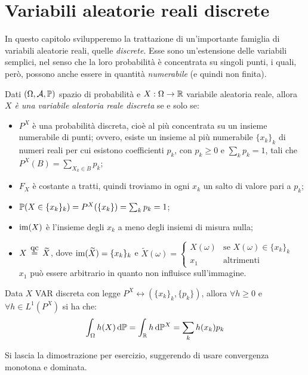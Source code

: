\section{Variabili aleatorie reali discrete}
In questo capitolo svilupperemo la trattazione di un'importante famiglia di variabili aleatorie reali, quelle \emph{discrete}. Esse sono un'estensione delle variabili semplici, nel senso che la loro probabilità è concentrata su singoli punti, i quali, però, possono anche essere in quantità \emph{numerabile} (e quindi non finita).

\smallskip
\begin{teo}
  Dati $(\Omega, \mathcal A, \mathbb P)$ spazio di probabilità e $X:\Omega\to\mathbb R$ variabile aleatoria reale, allora \textit{$X$ è una variabile aleatoria reale discreta} se e solo se:
  \begin{itemize}
    \item $P^{X}$ è una probabilità discreta, cioè al più concentrata su un insieme numerabile di punti; ovvero, esiste un insieme al più numerabile $\{x_{k}\}_{k}$ di numeri reali per cui esistono coefficienti $p_{k}$, con $p_{k}\geq0$ e $\sum_{k}p_{k} = 1$, tali che $P^{X}(B)=\sum_{X_{k}\in B}p_{k}$;
    \item $F_{X}$ è costante a tratti, quindi troviamo in ogni $x_{k}$ un salto di valore pari a $p_{k}$;
    \item $\mathbb P(X\in \{x_{k}\}_{k})=P^{X}(\{x_{k}\})=\sum_{k}p_{k}=1$;
    \item $\operatorname{im}(X)$ è l'insieme degli $x_{k}$ a meno degli insiemi di misura nulla;
    \item $X\aceq\widetilde{X}$, dove $\operatorname{im}(\widetilde{X})=\{{x}_{k}\}_{k}$ e
    $
      \widetilde{X}(\omega)=
      \begin{cases}
      X(\omega)   &\text{se } X(\omega)\in \{{x}_{k}\}_{k}\\
      x_{1}   & \text{altrimenti}
      \end{cases}
    $\\
    $x_1$ può essere arbitrario in quanto non influisce sull'immagine.
  \end{itemize}
\end{teo}

\medskip
\begin{prop}
  Data $X$ VAR discreta con legge $P^{X} \leftrightarrow (\{{x}_{k}\}_{k},\{{p}_{k}\})$, allora $\forall h \geq 0$ e $\forall h\in L^{1}(P^{X})$ si ha che:
  $$\int_{\Omega} h(X)\, \mathrm d \mathbb P=\int_{\mathbb R}h\, \mathrm d \mathbb P^{X}= \sum_{k}h(x_{k})p_{k}$$
\end{prop}
Si lascia la dimostrazione per esercizio, suggerendo di usare convergenza monotona e dominata.

